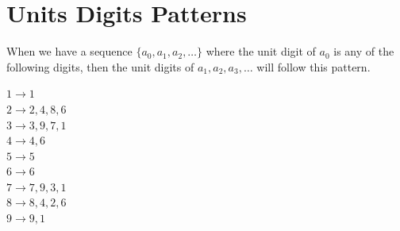 \documentclass[11pt,letterpaper]{article}
\begin{document}
\begin{minipage}{\textwidth}
     \section*{Units Digits Patterns} 
     When we have a sequence $\{a_0, a_1, a_2, \ldots\}$ where the unit digit of $a_0$ is any of the following digits, then the unit digits of $a_1, a_2, a_3, \ldots$ will follow this pattern. \\ 
     \vspace{0.05cm}
     
     $1 \rightarrow 1$ \\
     $2 \rightarrow 2,4,8,6$ \\
     $3 \rightarrow 3,9,7,1$ \\
     $4 \rightarrow 4, 6$ \\
     $5 \rightarrow 5$ \\
     $6 \rightarrow 6$ \\
     $7 \rightarrow 7,9,3,1$ \\
     $8 \rightarrow 8,4,2,6$ \\
     $9 \rightarrow 9, 1$ \\
\end{minipage}
\end{document}

